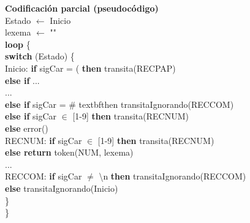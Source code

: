 \documentclass[\main/Apuntes_PL.tex]{subfiles}
\begin{document}
      \newpage
      \par
      \textbf{Codificación parcial (pseudocódigo)}\\
      \vspace{5mm}
      \hspace{5mm}Estado $\leftarrow$ Inicio\\
      \hspace{5mm}lexema $\leftarrow$ ""\\
      \hspace{5mm}\textbf{loop} \{\\
      \hspace{10mm}\textbf{switch} (Estado) \{\\
      \hspace{10mm}Inicio: \textbf{if} sigCar = ( \textbf{then} transita(RECPAP)\\
      \hspace{22mm}\textbf{else if} ...\\
      \hspace{22mm}...\\
      \hspace{22mm}\textbf{else if} sigCar = \# textbf{then} transitaIgnorando(RECCOM)\\
      \hspace{22mm}\textbf{else if} sigCar $\in$ [1-9] \textbf{then} transita(RECNUM)\\
      \hspace{22mm}\textbf{else} error()\\
      \vspace{2mm}
      \hspace{10mm}RECNUM: \textbf{if} sigCar $\in$ [1-9] \textbf{then} transita(RECNUM)\\
      \hspace{30mm}\textbf{else return} token(NUM, lexema)\\
      \vspace{2mm}
      \hspace{10mm}...\\
      \vspace{2mm}
      \hspace{10mm}RECCOM: \textbf{if} sigCar $\neq$ \textbackslash n \textbf{then} transitaIgnorando(RECCOM)\\
      \hspace{30mm}\textbf{else} transitaIgnorando(Inicio)\\
      \hspace{10mm}\}\\
      \hspace{5mm}\}\\
\end{document}
